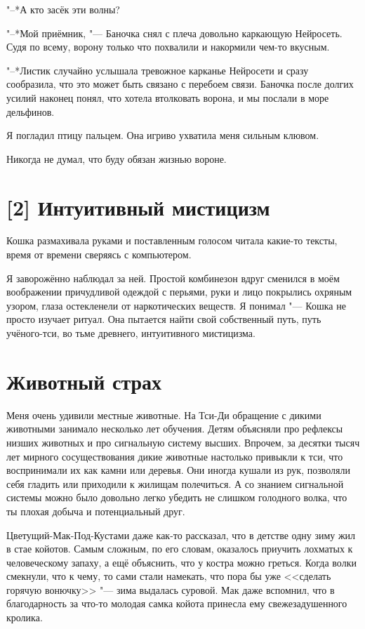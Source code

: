"--*А кто засёк эти волны?

"--*Мой приёмник, "--- Баночка снял с плеча довольно каркающую Нейросеть.
Судя по всему, ворону только что похвалили и накормили чем-то вкусным.

"--*Листик случайно услышала тревожное карканье Нейросети и сразу сообразила, что это может быть связано с перебоем связи.
Баночка после долгих усилий наконец понял, что хотела втолковать ворона, и мы послали в море дельфинов.

Я погладил птицу пальцем.
Она игриво ухватила меня сильным клювом.

Никогда не думал, что буду обязан жизнью вороне.

\section{[2] Интуитивный мистицизм}

Кошка размахивала руками и поставленным голосом читала какие-то тексты, время от времени сверяясь с компьютером.

Я заворожённо наблюдал за ней.
Простой комбинезон вдруг сменился в моём воображении причудливой одеждой с перьями, руки и лицо покрылись охряным узором, глаза остекленели от наркотических веществ.
Я понимал "--- Кошка не просто изучает ритуал.
Она пытается найти свой собственный путь, путь учёного-тси, во тьме древнего, интуитивного мистицизма.

\section{Животный страх}

Меня очень удивили местные животные.
На Тси-Ди обращение с дикими животными занимало несколько лет обучения.
Детям объясняли про рефлексы низших животных и про сигнальную систему высших.
Впрочем, за десятки тысяч лет мирного сосуществования дикие животные настолько привыкли к тси, что воспринимали их как камни или деревья.
Они иногда кушали из рук, позволяли себя гладить или приходили к жилищам полечиться.
А со знанием сигнальной системы можно было довольно легко убедить не слишком голодного волка, что ты плохая добыча и потенциальный друг.

Цветущий-Мак-Под-Кустами даже как-то рассказал, что в детстве одну зиму жил в стае койотов.
Самым сложным, по его словам, оказалось приучить лохматых к человеческому запаху, а ещё объяснить, что у костра можно греться.
Когда волки смекнули, что к чему, то сами стали намекать, что пора бы уже <<сделать горячую вонючку>> "--- зима выдалась суровой.
Мак даже вспомнил, что в благодарность за что-то молодая самка койота принесла ему свежезадушенного кролика.

